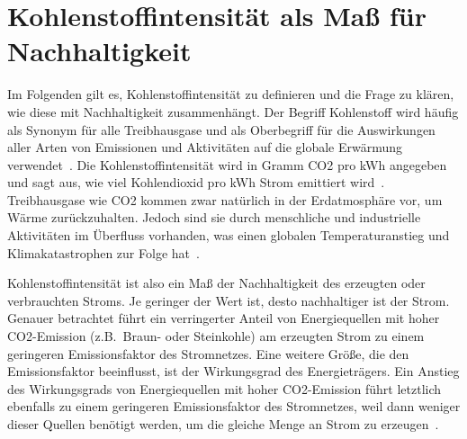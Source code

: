 \section{Kohlenstoffintensität als Maß für Nachhaltigkeit}\label{CAP:ci}
Im Folgenden gilt es, Kohlenstoffintensität zu definieren und die Frage zu klären, wie diese mit Nachhaltigkeit zusammenhängt.
Der Begriff Kohlenstoff wird häufig als Synonym für alle Treibhausgase und als Oberbegriff für die Auswirkungen aller Arten von Emissionen und Aktivitäten auf die globale Erwärmung verwendet~\cite{GreenSoftwareFoundation.2022}.
Die Kohlenstoffintensität wird in Gramm \ac{CO2} pro \ac{kWh} angegeben und sagt aus, wie viel Kohlendioxid pro \ac{kWh} Strom emittiert wird~\cite{LyndonRuff.20220420T15:34:17.000Z}.
Treibhausgase wie \ac{CO2} kommen zwar natürlich in der Erdatmosphäre vor, um Wärme zurückzuhalten.
Jedoch sind sie durch menschliche und industrielle Aktivitäten im Überfluss vorhanden, was einen globalen Temperaturanstieg und Klimakatastrophen zur Folge hat~\cite{Currie.2024}.

Kohlenstoffintensität ist also ein Maß der Nachhaltigkeit des erzeugten oder verbrauchten Stroms.
Je geringer der Wert ist, desto nachhaltiger ist der Strom.
Genauer betrachtet führt ein verringerter Anteil von Energiequellen mit hoher \ac{CO2}-Emission (z.B.\ Braun- oder Steinkohle) am erzeugten Strom zu einem geringeren Emissionsfaktor des Stromnetzes.
Eine weitere Größe, die den Emissionsfaktor beeinflusst, ist der Wirkungsgrad des Energieträgers.
Ein Anstieg des Wirkungsgrads von Energiequellen mit hoher \ac{CO2}-Emission führt letztlich ebenfalls zu einem geringeren Emissionsfaktor des Stromnetzes, weil dann weniger dieser Quellen benötigt werden, um die gleiche Menge an Strom zu erzeugen~\cite{Icha.2020}.

